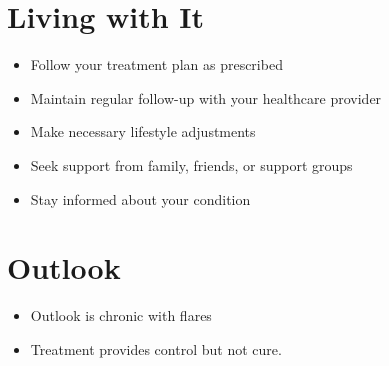 \section{Living with It}
\begin{itemize}[noitemsep]
  \item Follow your treatment plan as prescribed
  \item Maintain regular follow-up with your healthcare provider
  \item Make necessary lifestyle adjustments
  \item Seek support from family, friends, or support groups
  \item Stay informed about your condition
\end{itemize}
\section{Outlook}
\begin{itemize}[noitemsep]
  \item Outlook is chronic with flares
  \item Treatment provides control but not cure.
\end{itemize}
